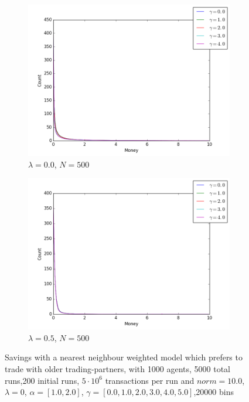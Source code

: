 \documentclass[a4paper,11pt]{article}
\begin{document}
{\begin{figure}[H]
	\centering
	\begin{subfigure}[t]{0.45\textwidth}
		\includegraphics[scale=0.4]{historic_lambda=0_0_alpha=1}
		\caption{$\lambda = 0.0$, $N=500$}
		\label{fig:historic_lambda=0_0_alpha=1}
	\end{subfigure}
	\begin{subfigure}[t]{0.45\textwidth}
		\includegraphics[scale=0.4]{historic_lambda=0_0_alpha=2}
		\caption{$\lambda = 0.5$, $N=500$}
		\label{fig:historic_lambda=0_0_alpha=2}
	\end{subfigure}
	\caption{Savings with a nearest neighbour weighted model which prefers to trade with older trading-partners, with 1000 agents, 5000 total runs,200 initial runs,  $5\cdot 10^{6}$ transactions per run and  $norm=10.0$,$\lambda=0$, $\alpha=[1.0,2.0]$, $\gamma=[0.0,1.0,2.0,3.0,4.0,5.0]$,20000 bins}
	\label{fig:history_lambda=0_0}
\end{figure}


}
\end{document}
